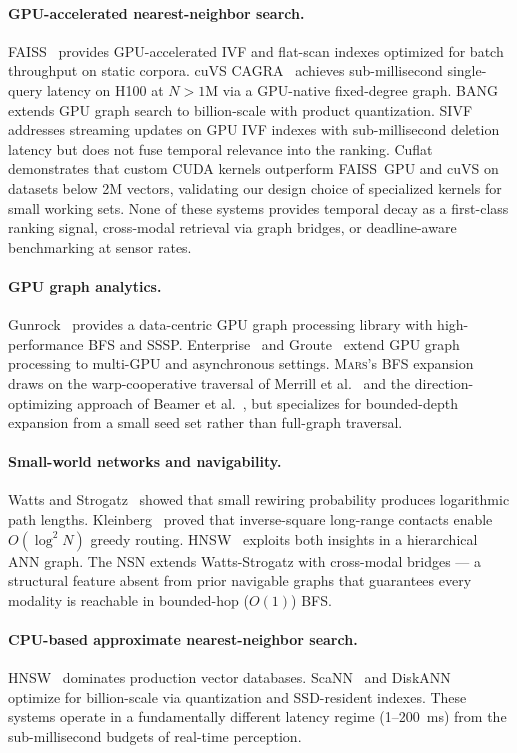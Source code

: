 \documentclass[11pt]{article}
\newcommand{\mars}{\textsc{Mars}}
\begin{document}
\paragraph{GPU-accelerated nearest-neighbor search.}
FAISS~\cite{faiss} provides GPU-accelerated IVF and flat-scan indexes
optimized for batch throughput on static corpora. cuVS
CAGRA~\cite{cuvs} achieves sub-millisecond single-query latency on H100
at $N > 1$M via a GPU-native fixed-degree graph.
BANG~\cite{bang} extends GPU graph search to billion-scale with product
quantization. SIVF~\cite{sivf} addresses streaming updates on GPU IVF
indexes with sub-millisecond deletion latency but does not fuse temporal
relevance into the ranking. Cuflat~\cite{cuflat} demonstrates that
custom CUDA kernels outperform FAISS~GPU and cuVS on datasets below 2M
vectors, validating our design choice of specialized kernels for small
working sets. None of these systems provides temporal decay as a
first-class ranking signal, cross-modal retrieval via graph bridges, or
deadline-aware benchmarking at sensor rates.

\paragraph{GPU graph analytics.}
Gunrock~\cite{gunrock} provides a data-centric GPU graph processing
library with high-performance BFS and SSSP. Enterprise~\cite{enterprise}
and Groute~\cite{groute} extend GPU graph processing to multi-GPU and
asynchronous settings. \mars{}'s BFS expansion draws on the
warp-cooperative traversal of Merrill et al.~\cite{merrill2012} and the
direction-optimizing approach of Beamer et al.~\cite{beamer2012}, but
specializes for bounded-depth expansion from a small seed set rather
than full-graph traversal.

\paragraph{Small-world networks and navigability.}
Watts and Strogatz~\cite{wattsstrogatz} showed that small rewiring
probability produces logarithmic path lengths.
Kleinberg~\cite{kleinberg} proved that inverse-square long-range
contacts enable $O(\log^2 N)$ greedy routing. HNSW~\cite{hnsw} exploits
both insights in a hierarchical ANN graph. The NSN extends
Watts-Strogatz with cross-modal bridges --- a structural feature absent
from prior navigable graphs that guarantees every modality is reachable
in bounded-hop ($O(1)$) BFS.

\paragraph{CPU-based approximate nearest-neighbor search.}
HNSW~\cite{hnsw} dominates production vector databases.
ScaNN~\cite{scann} and DiskANN~\cite{diskann} optimize for
billion-scale via quantization and SSD-resident indexes. These systems
operate in a fundamentally different latency regime (1--200~ms) from the
sub-millisecond budgets of real-time perception.
\end{document}
